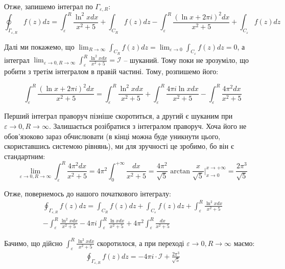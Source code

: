 \documentclass[oneside,solution]{karazin-complan-assign}
\begin{document}
Отже, запишемо інтеграл по $\Gamma_{\varepsilon, R}$:
\begin{equation*}
    \oint_{\Gamma_{\varepsilon, R}} f(z)dz = \int_{\varepsilon}^R \frac{\ln^2 x dx}{x^2+5} + \int_{C_R}f(z)dz - \int_{\varepsilon}^R \frac{(\ln x + 2\pi i)^2dx}{x^2+5} + \int_{C_{\varepsilon}}f(z)dz
\end{equation*}

Далі ми покажемо, що $\lim_{R \to \infty}\int_{C_R}f(z)dz = \lim_{\varepsilon \to 0}\int_{C_{\varepsilon}}f(z)dz = 0$, а інтеграл $\lim_{\varepsilon \to 0, R \to \infty}\int_{\varepsilon}^R \frac{\ln^2 x dx}{x^2+5} = \mathcal{I}$ -- шуканий. Тому поки не зрозуміло, що робити з третім інтегралом в правій частині. Тому, розпишемо його:

\begin{equation}
    \int_{\varepsilon}^R \frac{(\ln x + 2\pi i)^2dx}{x^2+5} = \int_{\varepsilon}^R \frac{\ln^2 x dx}{x^2+5} + \int_{\varepsilon}^R \frac{4\pi i \ln x dx}{x^2+5} - \int_{\varepsilon}^R \frac{4\pi^2 dx}{x^2+5}
\end{equation}

Перший інтеграл праворуч пізніше скоротиться, а другий є шуканим при $\varepsilon \to 0, R \to \infty$. Залишається розібратися з інтегралом праворуч. Хоча його не обов'язоково зараз обчислювати (в кінці можна буде уникнути цього, скориставшись системою рівнянь), ми для зручності це зробимо, бо він є стандартним:
\begin{equation}
    \lim_{\varepsilon \to 0, R \to \infty}\int_{\varepsilon}^R \frac{4\pi^2 dx}{x^2+5} = 4\pi^2 \int_{0}^{+\infty} \frac{dx}{x^2+5} = \frac{4\pi^2}{\sqrt{5}}\arctan \frac{x}{\sqrt{5}}\Big|_{x \to 0}^{x \to +\infty} = \frac{2\pi^3}{\sqrt{5}}
\end{equation}

Отже, повернемось до нашого початкового інтегралу:
\begin{gather}
    \oint_{\Gamma_{\varepsilon, R}} f(z)dz = \int_{C_R}f(z)dz + \int_{C_{\varepsilon}}f(z)dz + \int_{\varepsilon}^R \frac{\ln^2 xdx}{x^2+5} \nonumber \\
    - \int_{\varepsilon}^R \frac{\ln^2 x dx}{x^2+5} - 4\pi i \int_{\varepsilon}^R \frac{\ln x dx}{x^2+5} + 4\pi^2\int_{\varepsilon}^R \frac{dx}{x^2+5}
\end{gather}

Бачимо, що дійсно $\int_{\varepsilon}^R \frac{\ln^2 xdx}{x^2+5}$ скоротилося, а при переході $\varepsilon \to 0, R \to \infty$ маємо:
\begin{gather}
    \oint_{\Gamma_{\varepsilon, R}} f(z)dz = -4\pi i \cdot  \mathcal{I} + \frac{2\pi^3}{\sqrt{5}}
\end{gather}
\end{document}
